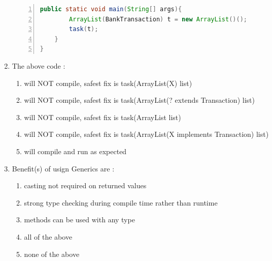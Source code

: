 \documentclass{article}
\begin{document}
\begin{enumerate}
\begin{lstlisting}[language=Java, numbers=left]
	public static void main(String[] args){
		ArrayList(BankTransaction) t = new ArrayList()();
		task(t);
	}
}
	\end{lstlisting}
	\item The above code :
	\begin{enumerate}
		\item will NOT compile, safest fix is task(ArrayList(X) list)
		\item will NOT compile, safest fix is task(ArrayList(? extends Transaction) list)
		\item will NOT compile, safest fix is task(ArrayList list)
		\item will NOT compile, safest fix is task(ArrayList(X implements Transaction) list)
		\item will compile and run as expected
	\end{enumerate}
	\item Benefit(s) of usign Generics are :
	\begin{enumerate}
		\item casting not required on returned values
		\item strong type checking during compile time rather than runtime
		\item methods can be used with any type
		\item all of the above
		\item none of the above
	\end{enumerate}
\end{enumerate} 
\end{document}
